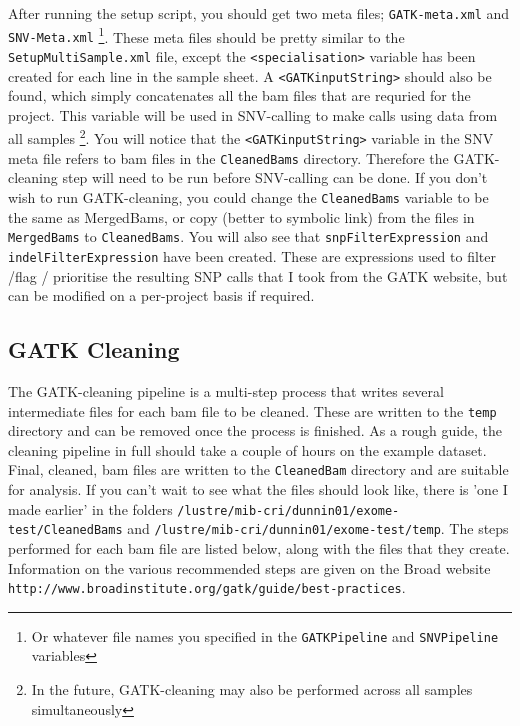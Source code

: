 \documentclass[a4paper,11pt]{article}
\begin{document}
After running the setup script, you should get two meta files; {\tt GATK-meta.xml} and {\tt SNV-Meta.xml} \footnote{Or whatever file names you specified in the {\tt GATKPipeline} and {\tt SNVPipeline} variables}. These meta files should be pretty similar to the {\tt SetupMultiSample.xml} file, except the {\tt <specialisation>} variable has been created for each line in the sample sheet. A {\tt <GATKinputString>} should also be found, which simply concatenates all the bam files that are requried for the project. This variable will be used in SNV-calling to make calls using data from all samples \footnote{In the future, GATK-cleaning may also be performed across all samples simultaneously}. You will notice that the {\tt <GATKinputString>} variable in the SNV meta file refers to bam files in the {\tt CleanedBams} directory. Therefore the GATK-cleaning step will need to be run before SNV-calling can be done. If you don't wish to run GATK-cleaning, you could change the {\tt CleanedBams} variable to be the same as MergedBams, or copy (better to symbolic link) from the files in {\tt MergedBams} to {\tt CleanedBams}. You will also see that {\tt snpFilterExpression} and {\tt indelFilterExpression} have been created. These are expressions used to filter /flag / prioritise the resulting SNP calls that I took from the GATK website, but can be modified on a per-project basis if required.

\subsection{GATK Cleaning}

The GATK-cleaning pipeline is a multi-step process that writes several intermediate files for each bam file to be cleaned. These are written to the {\tt temp} directory and can be removed once the process is finished. As a rough guide, the cleaning pipeline in full should take a couple of hours on the example dataset. Final, cleaned, bam files are written to the {\tt CleanedBam} directory and are suitable for analysis. If you can't wait to see what the files should look like, there is 'one I made earlier' in the folders {\tt /lustre/mib-cri/dunnin01/exome-test/CleanedBams} and {\tt /lustre/mib-cri/dunnin01/exome-test/temp}. The steps performed for each bam file are listed below, along with the files that they create. Information on the various recommended steps are given on the Broad website \\

{\tt http://www.broadinstitute.org/gatk/guide/best-practices}. 
\end{document}
